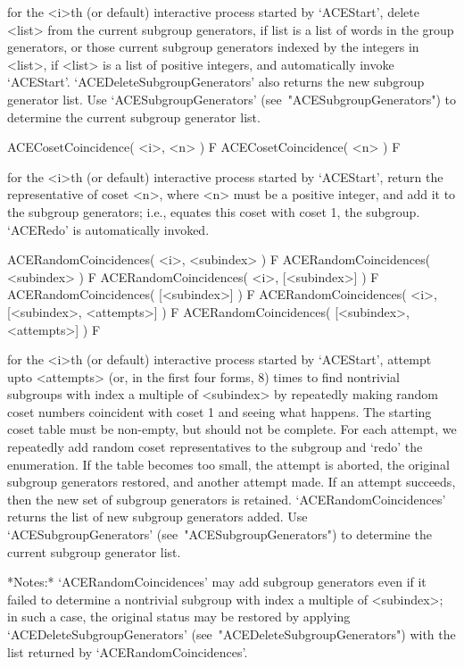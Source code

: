 for the <i>th (or  default)  interactive  {\ACE}  process  started  by
`ACEStart', delete <list> from the  current  subgroup  generators,  if
list is a list of words in the  group  generators,  or  those  current
subgroup generators indexed by the integers in <list>, if <list> is  a
list  of  positive  integers,  and  automatically  invoke  `ACEStart'.
`ACEDeleteSubgroupGenerators' also returns the new subgroup  generator
list.  Use  `ACESubgroupGenerators'  (see~"ACESubgroupGenerators")  to
determine the current subgroup generator list.

\>ACECosetCoincidence( <i>, <n> ) F
\>ACECosetCoincidence( <n> ) F

for the <i>th (or  default)  interactive  {\ACE}  process  started  by
`ACEStart', return the representative of coset <n>, where <n> must  be
a positive integer, and add  it  to  the  subgroup  generators;  i.e.,
equates  this  coset  with  coset  1,  the  subgroup.   `ACERedo'   is
automatically invoked.

\>ACERandomCoincidences( <i>, <subindex> ) F
\>ACERandomCoincidences( <subindex> ) F
\>ACERandomCoincidences( <i>, [<subindex>] ) F
\>ACERandomCoincidences( [<subindex>] ) F
\>ACERandomCoincidences( <i>, [<subindex>, <attempts>] ) F
\>ACERandomCoincidences( [<subindex>, <attempts>] ) F

for the <i>th (or  default)  interactive  {\ACE}  process  started  by
`ACEStart', attempt upto <attempts> (or, in the first four  forms,  8)
times to find nontrivial subgroups with index a multiple of <subindex>
by repeatedly making random coset numbers coincident with coset 1  and
seeing what happens. The starting coset table must be  non-empty,  but
should not be complete. For each attempt,  we  repeatedly  add  random
coset representatives to the subgroup and `redo' the  enumeration.  If
the table becomes too small, the  attempt  is  aborted,  the  original
subgroup generators restored, and another attempt made. If an  attempt
succeeds, then  the  new  set  of  subgroup  generators  is  retained.
`ACERandomCoincidences' returns the list of  new  subgroup  generators
added. Use  `ACESubgroupGenerators'  (see~"ACESubgroupGenerators")  to
determine the current subgroup generator list.

*Notes:* 
`ACERandomCoincidences' may add subgroup generators even if it  failed
to  determine  a  nontrivial  subgroup  with  index  a   multiple   of
<subindex>; in such a case, the original status  may  be  restored  by
applying                                 `ACEDeleteSubgroupGenerators'
(see~"ACEDeleteSubgroupGenerators")  with   the   list   returned   by
`ACERandomCoincidences'.

